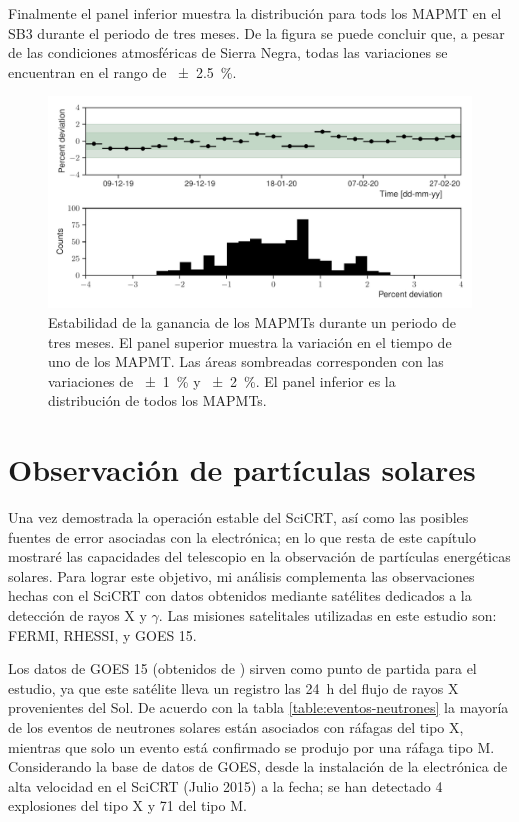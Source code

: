 Finalmente el panel inferior muestra la distribución para tods los MAPMT en el SB3 durante el periodo de tres meses. De la figura se puede concluir que, a pesar de las condiciones atmosféricas de Sierra Negra, todas las variaciones se encuentran en el rango de \SI{\pm 2.5}{\percent}.

\begin{figure}
        \centering
        \includegraphics[width=\textwidth]{neutron-mip_stability.pdf}
        \caption{Estabilidad de la ganancia de los MAPMTs durante un periodo de tres meses. El panel superior muestra la variación en el tiempo de uno de los MAPMT. Las áreas sombreadas corresponden con las variaciones de \SI{\pm 1}{\percent} y \SI{\pm 2}{\percent}. El panel inferior es la distribución de todos los MAPMTs.}
        \label{fig:mip-stability}
\end{figure}

\section{Observación de partículas solares}

Una vez demostrada la operación estable del SciCRT, así como las posibles fuentes de error asociadas con la electrónica; en lo que resta de este capítulo mostraré las capacidades del telescopio en la observación de partículas energéticas solares. Para lograr este objetivo, mi análisis complementa las observaciones hechas con el SciCRT con datos obtenidos mediante satélites dedicados a la detección de rayos X y $\gamma$. Las misiones satelitales utilizadas en este estudio son: FERMI, RHESSI, y GOES \num{15}.

Los datos de GOES \num{15} (obtenidos de \cite{goesdata}) sirven como punto de partida para el estudio, ya que este satélite lleva un registro las \SI{24}{\hour} del flujo de rayos X provenientes del Sol. De acuerdo con la tabla \ref{table:eventos-neutrones} la mayoría de los eventos de neutrones solares están asociados con ráfagas del tipo X, mientras que solo un evento está confirmado se produjo por una ráfaga tipo M. Considerando la base de datos de GOES, desde la instalación de la electrónica de alta velocidad en el SciCRT (Julio \num{2015}) a la fecha; se han detectado \num{4} explosiones del tipo X y \num{71} del tipo M.

